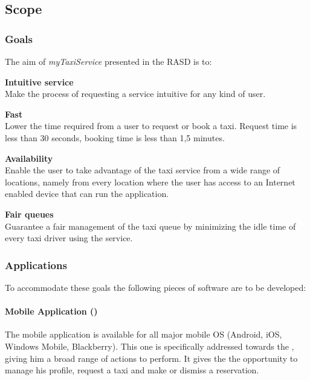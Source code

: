 \newpage

\subsection{Scope}
\label{sub:scope}
\subsubsection{Goals} %
\label{ssub:goals}
The aim of \emph{myTaxiService} presented in the RASD is to:
\begin{enumerate} [label = \textbf{[G\arabic*]}]
\item \textbf{Intuitive service}\hfill \\
\label{goal:intuitive}
Make the process of requesting a service intuitive for any kind of user.
\item \textbf{Fast}\hfill \\
\label{goal:time}
Lower the time required from a user to request or book a taxi. Request time is less than 30 seconds, booking time is less than 1,5 minutes.
\item \textbf{Availability}\hfill \\
\label{goal:availability}
Enable the user to take advantage of the taxi service from a wide range of locations, namely from every location where the user has access to an Internet enabled device that can run the application.
\item \textbf{Fair queues}\hfill \\
\label{goal:queue}
Guarantee a fair management of the taxi queue by minimizing the idle time of every taxi driver using the service.
\end{enumerate}

\subsubsection{Applications} %
\label{ssub:applications}
To accommodate these goals the following pieces of software are to be developed:

\paragraph{Mobile Application (\emph{})} \indent
\label{app:mobileuser}
  The mobile application is available for all major mobile OS (Android, iOS, Windows Mobile, Blackberry).
  This one is specifically addressed towards the \emph{}, giving him a broad range of actions to perform.
  It gives the \emph{} the opportunity to manage his profile, request a taxi and make or dismiss a reservation. %

